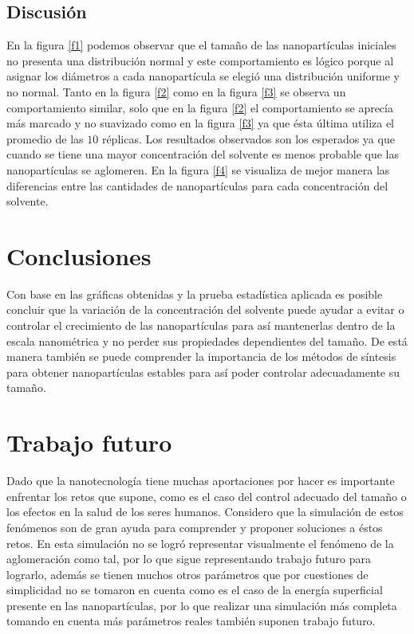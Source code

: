\documentclass[3p,times,twocolumn]{elsarticle}
\begin{document}
\subsection{Discusión}
En la figura \ref{f1} podemos observar que el tamaño de las nanopartículas iniciales no presenta una distribución normal y este comportamiento es lógico porque al asignar los diámetros a cada nanopartícula se elegió una distribución uniforme y no normal. Tanto en la figura \ref{f2} como en la figura \ref{f3} se observa un comportamiento similar, solo que en la figura \ref{f2} el comportamiento se aprecía más marcado y no suavizado como en la figura \ref{f3} ya que ésta última utiliza el promedio de las $10$ réplicas. Los resultados observados son los esperados ya que cuando se tiene una mayor concentración del solvente es menos probable que las nanopartículas se aglomeren. En la figura \ref{f4} se visualiza de mejor manera las diferencias entre las cantidades de nanopartículas para cada concentración del solvente.

\section{Conclusiones}
Con base en las gráficas obtenidas y la prueba estadística aplicada es posible concluir que la variación de la concentración del solvente puede ayudar a evitar o controlar el crecimiento de las nanopartículas para así mantenerlas dentro de la escala nanométrica y no perder sus propiedades dependientes del tamaño. De está manera también se puede comprender la importancia de los métodos de síntesis para obtener nanopartículas estables para así poder controlar adecuadamente su tamaño.

\section{Trabajo futuro}
Dado que la nanotecnología tiene muchas aportaciones por hacer es importante enfrentar los retos que supone, como es el caso del control adecuado del tamaño o los efectos en la salud de los seres humanos. Considero que la simulación de estos fenómenos son de gran ayuda para comprender y proponer soluciones a éstos retos. En esta simulación no se logró representar visualmente el fenómeno de la aglomeración como tal, por lo que sigue representando trabajo futuro para lograrlo, además se tienen muchos otros parámetros que por cuestiones de simplicidad no se tomaron en cuenta como es el caso de la energía superficial presente en las nanopartículas, por lo que realizar una simulación más completa tomando en cuenta más parámetros reales también suponen trabajo futuro.

\newpage



\end{document}
